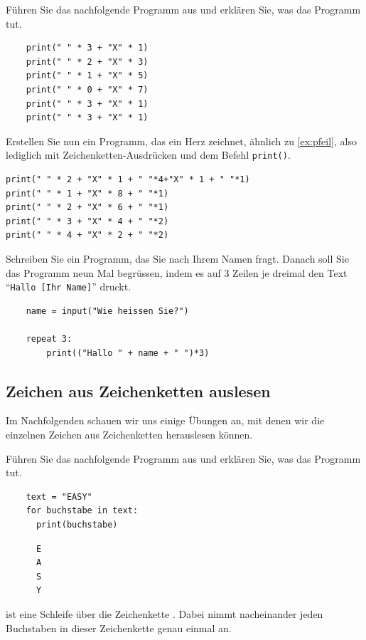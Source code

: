 \begin{myexercise}\label{ex:pfeil}
Führen Sie das nachfolgende Programm aus und erklären Sie, was das Programm tut.
  \begin{lstlisting}
    print(" " * 3 + "X" * 1)
    print(" " * 2 + "X" * 3)
    print(" " * 1 + "X" * 5)
    print(" " * 0 + "X" * 7)
    print(" " * 3 + "X" * 1)
    print(" " * 3 + "X" * 1)
  \end{lstlisting}
\end{myexercise}


\begin{myexercise}
Erstellen Sie nun ein Programm, das ein Herz zeichnet, ähnlich zu \cref{ex:pfeil}, also lediglich mit Zeichenketten-Ausdrücken und dem Befehl \lstinline|print()|.
\begin{myanswer}
\begin{lstlisting}
print(" " * 2 + "X" * 1 + " "*4+"X" * 1 + " "*1)
print(" " * 1 + "X" * 8 + " "*1)
print(" " * 2 + "X" * 6 + " "*1)
print(" " * 3 + "X" * 4 + " "*2)
print(" " * 4 + "X" * 2 + " "*2)
\end{lstlisting}
\end{myanswer}
\end{myexercise}

\begin{myexercise}\label{ex:name}
Schreiben Sie ein Programm, das Sie nach Ihrem Namen fragt. Danach soll Sie das Programm neun Mal begrüssen, indem es auf 3 Zeilen je dreimal den Text ``\texttt{Hallo [Ihr Name]}'' druckt.
\begin{myanswer}
  \begin{lstlisting}
	name = input("Wie heissen Sie?")
	
	repeat 3:
	    print(("Hallo " + name + " ")*3)
  \end{lstlisting}
\end{myanswer}
\end{myexercise}


\subsection{Zeichen aus Zeichenketten auslesen}
Im Nachfolgenden schauen wir uns einige Übungen an, mit denen wir die einzelnen Zeichen aus Zeichenketten herauslesen können.

\begin{myexercise}
  Führen Sie das nachfolgende Programm aus und erklären Sie, was das Programm tut.
  \begin{lstlisting}
    text = "EASY"
    for buchstabe in text:
      print(buchstabe)
  \end{lstlisting}
  \begin{myanswer}
    \begin{lstlisting}
      E
      A
      S
      Y
    \end{lstlisting}
     ist eine Schleife über die Zeichenkette . Dabei nimmt  nacheinander jeden Buchstaben in dieser Zeichenkette genau einmal an.
  \end{myanswer}
\end{myexercise}

